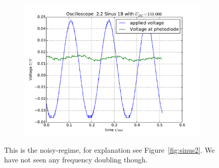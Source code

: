 \begin{figure}
\begin{subfigure}[b]{\picwidth}
        \caption{}
    \end{subfigure}
    \begin{subfigure}[b]{\picwidth}
        \includegraphics[width=\textwidth]{analysis/figures/22sinus18}
        \caption{}
    \end{subfigure}

    \caption{This is the noisy-regime, for explanation see
        Figure~\ref{fig:sinus2}. We have not seen any frequency
        doubling though.}
    \label{fig:sinus3}
\end{figure}

